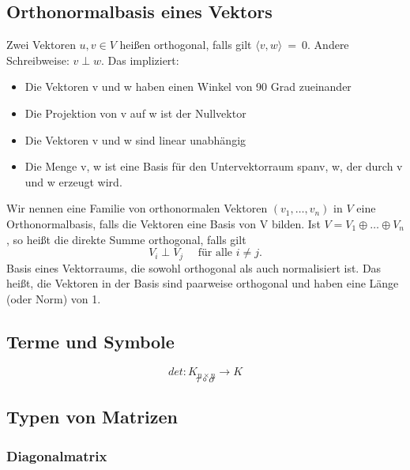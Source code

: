 \documentclass[9pt]{article} %
\begin{document}
\subsection{Orthonormalbasis eines Vektors}
Zwei Vektoren $u,v \in V$ heißen orthogonal, falls gilt $\langle v, w \rangle \ = \ 0.$ Andere Schreibweise: $v \perp w$.
\cite{MathDataScience2021} 
Das impliziert: 
\begin{itemize}
    \item Die Vektoren v und w haben einen Winkel von 90 Grad zueinander
    \item Die Projektion von v auf w ist der Nullvektor
    \item Die Vektoren v und w sind linear unabhängig
    \item Die Menge {v, w} ist eine Basis für den Untervektorraum span{v, w}, der durch v und w erzeugt wird.
\end{itemize}
Wir nennen eine Familie von orthonormalen Vektoren $(v_1, \ldots, v_n)$ in $V$ eine Orthonormalbasis, falls die Vektoren eine Basis von V bilden. Ist $V = V_1 \oplus \ldots \oplus V_n$, so heißt die direkte Summe orthogonal, falls gilt
\begin{equation*}
V_i \perp V_j \quad \text{ für alle } i \neq j.
\end{equation*}
\cite{MathDataScience2021} 
 Basis eines Vektorraums, die sowohl orthogonal als auch normalisiert ist. Das heißt, die Vektoren in der Basis sind paarweise orthogonal und haben eine Länge (oder Norm) von 1.




\subsection{Terme und Symbole}

\begin{equation*}
    det : K_{n \times n} \rightarrow K
\end{equation*}
\begin{equation*}
    \tau \circ \sigma
\end{equation*}

\subsection{Typen von Matrizen}
\subsubsection{Diagonalmatrix}
\end{document}

